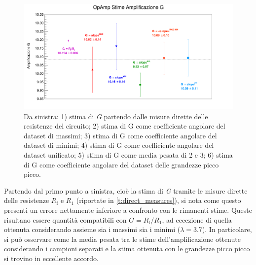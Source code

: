 \documentclass[a4paper,11pt]{article} %
\begin{document}
\begin{figure}[H]
	\centering
	\includegraphics[width=\linewidth]{../Plots/Report_Plots/opamp_comp.png}
	\caption{Da sinistra: 1) stima di \textit{G} partendo dalle misure dirette delle resistenze del circuito;
	2) stima di G come coefficiente angolare del dataset di massimi; 3) stima di G come coefficiente 
	angolare del dataset di minimi; 4) stima di G come coefficiente angolare del dataset unificato; 
	5) stima di G come media pesata di 2 e 3; 6) stima di G come coefficiente angolare del dataset delle 
	grandezze picco picco.}
	\label{i:opamp_comp}
\end{figure}

\noindent Partendo dal primo punto a sinistra, cioè la stima di \textit{G} tramite le misure dirette delle resistenze
$R_{\text{f}}$ e $R_{1}$ (riportate in \autoref{t:direct_measures}), si nota come questo presenti un errore nettamente
inferiore a confronto con le rimanenti stime. Queste risultano essere quantità compatibili con $G=R_{\text{f}}/R_{1}$,
ad eccezione di quella ottenuta considerando assieme sia i massimi sia i minimi ($\lambda = 3.7$). In particolare, si
può osservare come la media pesata tra le stime dell'amplificazione ottenute considerando i campioni separati e la stima
ottenuta con le grandezze picco picco si trovino in eccellente accordo. 
\end{document}
